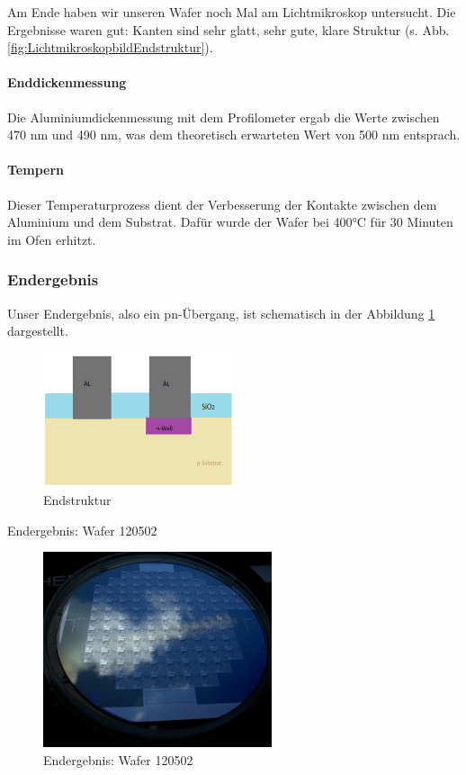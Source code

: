 Am Ende haben wir unseren Wafer noch Mal am Lichtmikroskop untersucht. Die Ergebnisse waren gut: Kanten sind sehr glatt, sehr gute, klare Struktur (s. Abb. \ref{fig:LichtmikroskopbildEndstruktur}).


\paragraph[Enddickenmessung]{Enddickenmessung}

Die Aluminiumdickenmessung mit dem Profilometer ergab die Werte zwischen 470 nm und 490 nm, was dem theoretisch erwarteten Wert von 500 nm entsprach.

\paragraph[Tempern ]{Tempern}

Dieser Temperaturprozess dient der Verbesserung der Kontakte  zwischen dem Aluminium und dem Substrat. Dafür wurde der Wafer bei 400°C für 30 Minuten im Ofen erhitzt.


\subsubsection[Endergebnis]{Endergebnis}
Unser Endergebnis, also ein pn-Übergang, ist schematisch  in der Abbildung \ref{fig:Endstruktur} dargestellt.

\begin{figure}[H]
    \centering
        \includegraphics[width=0.5\textwidth]{bilder/Endstruktur.png}
    \caption{Endstruktur}
    \label{fig:Endstruktur}
\end{figure}

Endergebnis: Wafer 120502

\begin{figure}[H]
    \centering
        \includegraphics[width=0.6\textwidth]{bilder/EndergebnisWafer120502.png}
    \caption{Endergebnis: Wafer 120502}
    \label{fig:EndergebnisWafer120502}
\end{figure}




